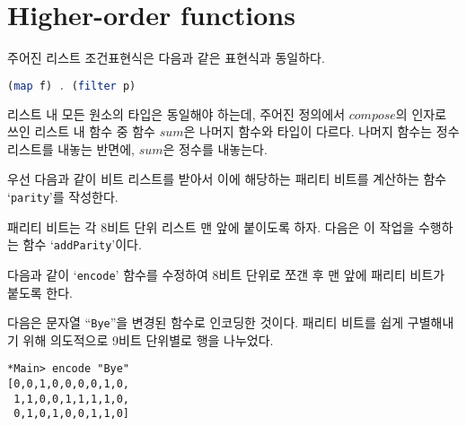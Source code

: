 \chapter{\Large{Higher-order functions}}

주어진 리스트 조건표현식은 다음과 같은 표현식과 동일하다.
\begin{lstlisting}[language=Haskell]
(map f) . (filter p)
\end{lstlisting}




리스트 내 모든 원소의 타입은 동일해야 하는데, 주어진 정의에서 $compose$의 인자로
쓰인 리스트 내 함수 중 함수 $sum$은 나머지 함수와 타입이 다르다. 나머지 함수는
정수 리스트를 내놓는 반면에, $sum$은 정수를 내놓는다.



우선 다음과 같이 비트 리스트를 받아서 이에 해당하는 패리티 비트를 계산하는 함수
`\texttt{parity}'를 작성한다.

패리티 비트는 각 8비트 단위 리스트 맨 앞에 붙이도록 하자. 다음은 이 작업을
수행하는 함수 `\texttt{addParity}'이다.

다음과 같이 `\texttt{encode}' 함수를 수정하여 8비트 단위로 쪼갠 후 맨
앞에 패리티 비트가 붙도록 한다.

다음은 문자열 ``\texttt{Bye}''을 변경된 함수로 인코딩한 것이다. 패리티 비트를
쉽게 구별해내기 위해 의도적으로 9비트 단위별로 행을 나누었다.
\begin{lstlisting}
*Main> encode "Bye"
[0,0,1,0,0,0,0,1,0,
 1,1,0,0,1,1,1,1,0,
 0,1,0,1,0,0,1,1,0]
\end{lstlisting}

